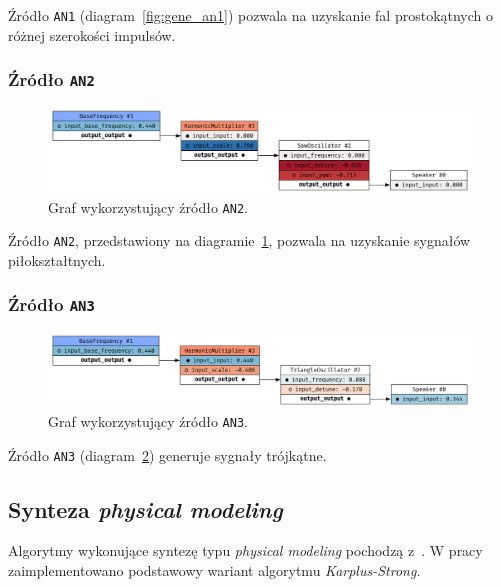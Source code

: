 Źródło \texttt{AN1} (diagram~\ref{fig:gene_an1}) pozwala na uzyskanie fal prostokątnych o różnej szerokości impulsów.


\subsubsection{Źródło \texttt{AN2}}

\begin{figure}[H]
    \centering
    \includegraphics[width=1.0\linewidth]{rys06/gene_an2.png}
    \caption{
      Graf wykorzystujący źródło \texttt{AN2}.
    }\label{fig:gene_an2}
\end{figure}

Źródło \texttt{AN2}, przedstawiony na diagramie~\ref{fig:gene_an2},
pozwala na uzyskanie sygnałów piłokształtnych.


\subsubsection{Źródło \texttt{AN3}}

\begin{figure}[H]
    \centering
    \includegraphics[width=1.0\linewidth]{rys06/gene_an3.png}
    \caption{
      Graf wykorzystujący źródło \texttt{AN3}.
    }\label{fig:gene_an3}
\end{figure}

Źródło \texttt{AN3} (diagram~\ref{fig:gene_an3}) generuje sygnały trójkątne.


\subsection{Synteza \textit{physical modeling}}

Algorytmy wykonujące syntezę typu \textit{physical modeling}
pochodzą z~\cite{computational_music_synthesis}. W pracy zaimplementowano
podstawowy wariant algorytmu \textit{Karplus-Strong}.

